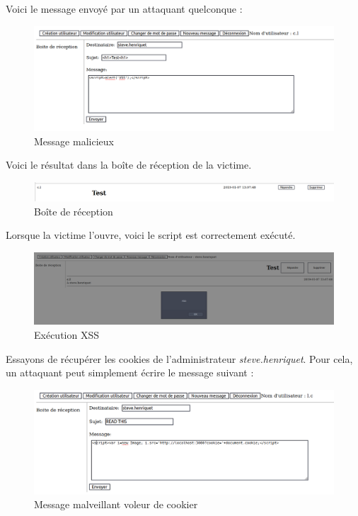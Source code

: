 \documentclass[12pt]{article}
\begin{document}
Voici le message envoyé par un attaquant quelconque : 
\begin{figure}[H]
\centering
\includegraphics[width=\linewidth]{images/xssAttack.png}
\caption{Message malicieux}
\end{figure}

Voici le résultat dans la boîte de réception de la victime.
\begin{figure}[H]
\centering
\includegraphics[width=\linewidth]{images/xssRecep.png}
\caption{Boîte de réception}
\end{figure}

Lorsque la victime l'ouvre, voici le script est correctement exécuté.
\begin{figure}[H]
\centering
\includegraphics[width=\linewidth]{images/xssOpen.png}
\caption{Exécution XSS}
\end{figure}

Essayons de récupérer les cookies de l'administrateur \textit{steve.henriquet}. Pour cela, un attaquant peut simplement écrire le message suivant : 

\begin{figure}[H]
\centering
\includegraphics[width=\linewidth]{images/cookieStealer.png}
\caption{Message malveillant voleur de cookier}
\end{figure}
\end{document}
